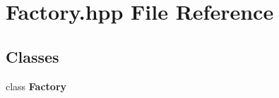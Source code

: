 \section{Factory.\-hpp File Reference}
\label{_factory_8hpp}
\subsection*{Classes}
\begin{DoxyCompactItemize}
\item 
class {\bf Factory}
\end{DoxyCompactItemize}
